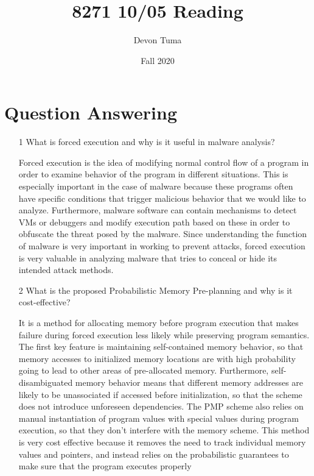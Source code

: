 \documentclass[11pt]{article}
\title{8271 10/05 Reading}
\author{Devon Tuma}
\date{Fall 2020}
\begin{document}
\maketitle

\section*{Question Answering}

\begin{itemize}
\item [1] What is forced execution and why is it useful in malware analysis?

  Forced execution is the idea of modifying normal control flow of a program in order to examine behavior of the program in different situations.
  This is especially important in the case of malware because these programs often have specific conditions that trigger malicious behavior that we would like to analyze.
  Furthermore, malware software can contain mechanisms to detect VMs or debuggers and modify execution path based on these in order to obfuscate the threat posed by the malware.
  Since understanding the function of malware is very important in working to prevent attacks, forced execution is very valuable in analyzing malware that tries to conceal or hide its intended attack methods.
  
\item [2] What is the proposed Probabilistic Memory Pre-planning and why is it cost-effective?

  It is a method for allocating memory before program execution that makes failure during forced execution less likely while preserving program semantics.
  The first key feature is maintaining self-contained memory behavior, so that memory accesses to initialized memory locations are with high probability going to lead to other areas of pre-allocated memory.
  Furthermore, self-disambiguated memory behavior means that different memory addresses are likely to be unassociated if accessed before initialization, so that the scheme does not introduce unforeseen dependencies.
  The PMP scheme also relies on manual instantiation of program values with special values during program execution, so that they don't interfere with the memory scheme.
  This method is very cost effective because it removes the need to track individual memory values and pointers, and instead relies on the probabilistic guarantees to make sure that the program executes properly
  
\end{itemize}
\end{document}
